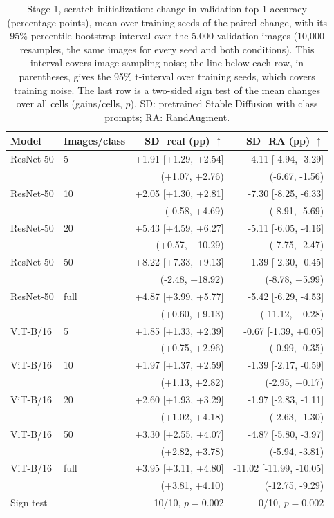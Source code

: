 \begin{table}[H]
\centering
\small
\setlength{\tabcolsep}{4pt}
\caption{Stage 1, scratch initialization: change in validation top-1 accuracy (percentage points), mean over training seeds of the paired change, with its 95\% percentile bootstrap interval over the 5{,}000 validation images (10{,}000 resamples, the same images for every seed and both conditions). This interval covers image-sampling noise; the line below each row, in parentheses, gives the 95\% t-interval over training seeds, which covers training noise. The last row is a two-sided sign test of the mean changes over all cells (gains/cells, $p$). SD: pretrained Stable Diffusion with class prompts; RA: RandAugment.}
\label{tab:stage1-scratch-bootstrap}
\begin{tabular}{llrr}
\toprule
Model & Images/class & SD$-$real (pp) $\uparrow$ & SD$-$RA (pp) $\uparrow$ \\
\midrule
ResNet-50 & 5 & +1.91 [+1.29, +2.54] & -4.11 [-4.94, -3.29] \\
 & & (+1.07, +2.76) & (-6.67, -1.56) \\
ResNet-50 & 10 & +2.05 [+1.30, +2.81] & -7.30 [-8.25, -6.33] \\
 & & (-0.58, +4.69) & (-8.91, -5.69) \\
ResNet-50 & 20 & +5.43 [+4.59, +6.27] & -5.11 [-6.05, -4.16] \\
 & & (+0.57, +10.29) & (-7.75, -2.47) \\
ResNet-50 & 50 & +8.22 [+7.33, +9.13] & -1.39 [-2.30, -0.45] \\
 & & (-2.48, +18.92) & (-8.78, +5.99) \\
ResNet-50 & full & +4.87 [+3.99, +5.77] & -5.42 [-6.29, -4.53] \\
 & & (+0.60, +9.13) & (-11.12, +0.28) \\
\midrule
ViT-B/16 & 5 & +1.85 [+1.33, +2.39] & -0.67 [-1.39, +0.05] \\
 & & (+0.75, +2.96) & (-0.99, -0.35) \\
ViT-B/16 & 10 & +1.97 [+1.37, +2.59] & -1.39 [-2.17, -0.59] \\
 & & (+1.13, +2.82) & (-2.95, +0.17) \\
ViT-B/16 & 20 & +2.60 [+1.93, +3.29] & -1.97 [-2.83, -1.11] \\
 & & (+1.02, +4.18) & (-2.63, -1.30) \\
ViT-B/16 & 50 & +3.30 [+2.55, +4.07] & -4.87 [-5.80, -3.97] \\
 & & (+2.82, +3.78) & (-5.94, -3.81) \\
ViT-B/16 & full & +3.95 [+3.11, +4.80] & -11.02 [-11.99, -10.05] \\
 & & (+3.81, +4.10) & (-12.75, -9.29) \\
\midrule
\multicolumn{2}{l}{Sign test} & 10/10, $p=0.002$ & 0/10, $p=0.002$ \\
\bottomrule
\end{tabular}
\end{table}
